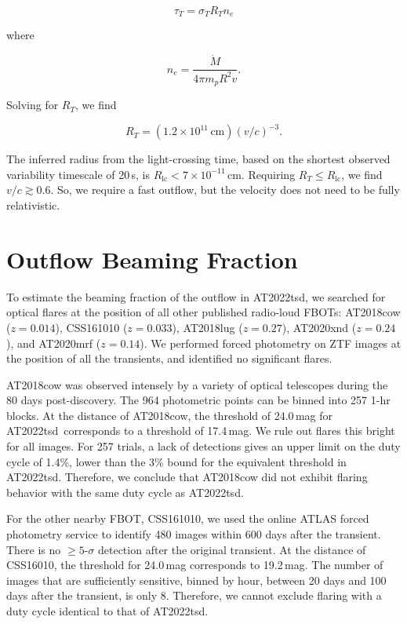 \documentclass{nature_plusfigure}
\newcommand{\at}{AT2022tsd}
\begin{document}
\begin{methods}
\begin{equation}
    \tau_T = \sigma_T R_T n_e
\end{equation}

\noindent where 

\begin{equation}
    n_e = \frac{\dot{M}}{4\pi m_p R^2 v}.
\end{equation}

\noindent Solving for $R_T$, we find

\begin{equation}
    R_T = (1.2 \times 10^{11}\,\mathrm{cm}) (v/c)^{-3}.
\end{equation}

The inferred radius from the light-crossing time, based on the shortest observed variability timescale of 20\,s, is $R_\mathrm{lc} < 7\times10^{-11}\,$cm. Requiring $R_T \leq R_\mathrm{lc}$, we find $v/c \gtrsim 0.6$. So, we require a fast outflow, but the velocity does not need to be fully relativistic. 

\section{Outflow Beaming Fraction}
\label{sec:beaming-fraction}

To estimate the beaming fraction of the outflow in \at, we searched for optical flares at the position of all other published radio-loud FBOTs: AT2018cow\cite{Prentice2018} ($z=0.014$), CSS161010\cite{Coppejans2020} ($z=0.033$),
AT2018lug\cite{Ho2020_Koala} ($z=0.27$),
AT2020xnd\cite{Perley2021} ($z=0.24$), and
AT2020mrf\cite{Yao2022} ($z=0.14$).
We performed forced photometry on ZTF images at the position of all the transients, and identified no significant flares. 

AT2018cow was observed intensely by a variety of optical telescopes during the 80 days post-discovery\cite{Perley2019}. The 964 photometric points can be binned into 257 1-hr blocks. At the distance of AT2018cow, the threshold of 24.0\,mag for \at\ corresponds to a threshold of 17.4\,mag. We rule out flares this bright for all images. For 257 trials, a lack of detections gives an upper limit on the duty cycle of 1.4\%, lower than the 3\% bound for the equivalent threshold in \at. Therefore, we conclude that AT2018cow did not exhibit flaring behavior with the same duty cycle as \at.

For the other nearby FBOT, CSS161010, we used the online ATLAS\cite{Tonry2018,Smith2020} forced photometry service\cite{Shingles2021} to identify 480 images within 600 days after the transient. There is no $\geq5$-$\sigma$ detection after the original transient. At the distance of CSS16010, the threshold for 24.0\,mag corresponds to 19.2\,mag. The number of images that are sufficiently sensitive, binned by hour, between 20 days and 100 days after the transient, is only 8. Therefore, we cannot exclude flaring with a duty cycle identical to that of \at.


\end{methods}
\end{document}

